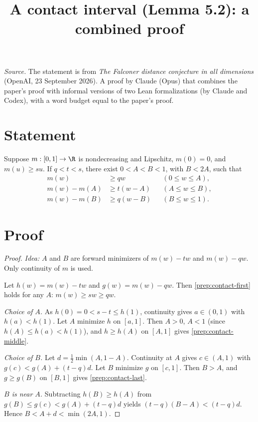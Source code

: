 \documentclass[11pt,reqno]{amsart}
\title{A contact interval (Lemma 5.2): a combined proof}
\begin{document}
\maketitle
\noindent\emph{Source.} The statement is from \emph{The Falconer distance conjecture in all dimensions} (OpenAI, 23 September 2026). A proof by Claude (Opus) that combines the paper's proof with informal versions of two Lean formalizations (by Claude and Codex), with a word budget equal to the paper's proof.

\section*{Statement}
\begin{lemma}\label{prep:contact}
Suppose $m:[0,1]\to\R$ is nondecreasing and Lipschitz,
$m(0)=0$, and $m(u)\ge su$. If $q<t<s$, there exist
$0<A<B<1$, with $B<2A$, such that
\begin{align}
 m(w)&\ge qw &&(0\le w\le A),\label{prep:contact-first}\\
 m(w)-m(A)&\ge t(w-A)&&(A\le w\le B),\label{prep:contact-middle}\\
 m(w)-m(B)&\ge q(w-B)&&(B\le w\le1).\label{prep:contact-last}
\end{align}
\end{lemma}

\section*{Proof}
\begin{proof}
\emph{Idea:} $A$ and $B$ are forward minimizers of $m(w)-tw$ and $m(w)-qw$. Only continuity of $m$ is used.

Let $h(w)=m(w)-tw$ and $g(w)=m(w)-qw$. Then \eqref{prep:contact-first} holds for any $A$: $m(w)\ge sw\ge qw$.

\emph{Choice of $A$.} As $h(0)=0<s-t\le h(1)$, continuity gives $a\in(0,1)$ with $h(a)<h(1)$. Let $A$ minimize $h$ on $[a,1]$. Then $A>0$, $A<1$ (since $h(A)\le h(a)<h(1)$), and $h\ge h(A)$ on $[A,1]$ gives \eqref{prep:contact-middle}.

\emph{Choice of $B$.} Let $d=\tfrac12\min(A,1-A)$. Continuity at $A$ gives $c\in(A,1)$ with $g(c)<g(A)+(t-q)d$. Let $B$ minimize $g$ on $[c,1]$. Then $B>A$, and $g\ge g(B)$ on $[B,1]$ gives \eqref{prep:contact-last}.

\emph{$B$ is near $A$.} Subtracting $h(B)\ge h(A)$ from $g(B)\le g(c)<g(A)+(t-q)d$ yields $(t-q)(B-A)<(t-q)d$. Hence $B<A+d<\min(2A,1)$.
\end{proof}
\end{document}
